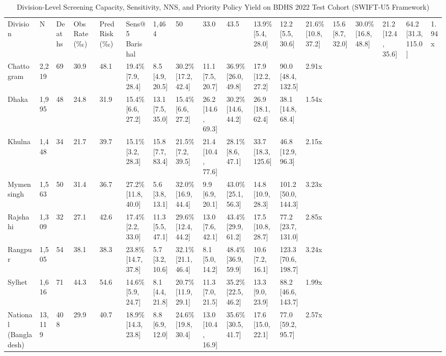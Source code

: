 \begin{table}[htbp]
\centering
\small
\begin{tabular}{lllllllllllll}
\toprule
Division & N & Deaths & Obs Rate (‰) & Pred Risk (‰) & Sens@5%
\midrule
Barishal & 1,464 & 50 & 33.0 & 43.5 & 13.9\% [5.4, 28.0] & 12.2 [5.5, 30.6] & 21.6\% [10.8, 37.2] & 15.6 [8.7, 32.0] & 30.0\% [16.8, 48.8] & 21.2 [12.4, 35.6] & 64.2 [31.3, 115.0] & 1.94x \\
Chattogram & 2,219 & 69 & 30.9 & 48.1 & 19.4\% [7.9, 28.4] & 8.5 [4.9, 20.5] & 30.2\% [17.2, 42.4] & 11.1 [7.5, 20.7] & 36.9\% [26.0, 49.8] & 17.9 [12.2, 27.2] & 90.0 [48.4, 132.5] & 2.91x \\
Dhaka & 1,995 & 48 & 24.8 & 31.9 & 15.4\% [6.6, 27.2] & 13.1 [7.5, 35.0] & 15.4\% [6.6, 27.2] & 26.2 [14.6, 69.3] & 30.2\% [14.6, 44.2] & 26.9 [18.1, 62.4] & 38.1 [14.8, 68.4] & 1.54x \\
Khulna & 1,448 & 34 & 21.7 & 39.7 & 15.1\% [3.2, 28.3] & 15.8 [7.7, 83.4] & 21.5\% [7.2, 39.5] & 21.4 [10.4, 77.6] & 28.1\% [8.6, 47.1] & 33.7 [18.3, 125.6] & 46.8 [12.9, 96.3] & 2.15x \\
Mymensingh & 1,563 & 50 & 31.4 & 36.7 & 27.2\% [11.8, 40.0] & 5.6 [3.8, 13.1] & 32.0\% [16.9, 44.4] & 9.9 [6.9, 20.1] & 43.0\% [25.1, 56.3] & 14.8 [10.9, 28.3] & 101.2 [50.0, 144.3] & 3.23x \\
Rajshahi & 1,309 & 32 & 27.1 & 42.6 & 17.4\% [2.2, 33.0] & 11.3 [5.5, 47.1] & 29.6\% [12.4, 44.2] & 13.0 [7.6, 42.1] & 43.4\% [29.9, 61.2] & 17.5 [10.8, 28.7] & 77.2 [23.7, 131.0] & 2.85x \\
Rangpur & 1,505 & 54 & 38.1 & 38.3 & 23.8\% [14.7, 37.8] & 5.7 [3.2, 10.6] & 32.1\% [21.1, 46.4] & 8.1 [5.0, 14.2] & 48.4\% [36.9, 59.9] & 10.6 [7.2, 16.1] & 123.3 [70.6, 198.7] & 3.24x \\
Sylhet & 1,616 & 71 & 44.3 & 54.6 & 14.6\% [5.9, 24.7] & 8.1 [4.4, 21.8] & 20.7\% [11.9, 29.1] & 11.3 [7.0, 21.5] & 35.2\% [22.5, 46.2] & 13.3 [9.0, 23.9] & 88.2 [46.6, 143.7] & 1.99x \\
National (Bangladesh) & 13,119 & 408 & 29.9 & 40.7 & 18.9\% [14.3, 23.8] & 8.8 [6.9, 12.0] & 24.6\% [19.8, 30.4] & 13.0 [10.4, 16.9] & 35.6\% [30.5, 41.7] & 17.6 [15.0, 22.1] & 77.0 [59.2, 95.7] & 2.57x \\
\bottomrule
\end{tabular}
\caption{Division-Level Screening Capacity, Sensitivity, NNS, and Priority Policy Yield on BDHS 2022 Test Cohort (SWIFT-U5 Framework)}
\label{tab:division_capacity}
\end{table}